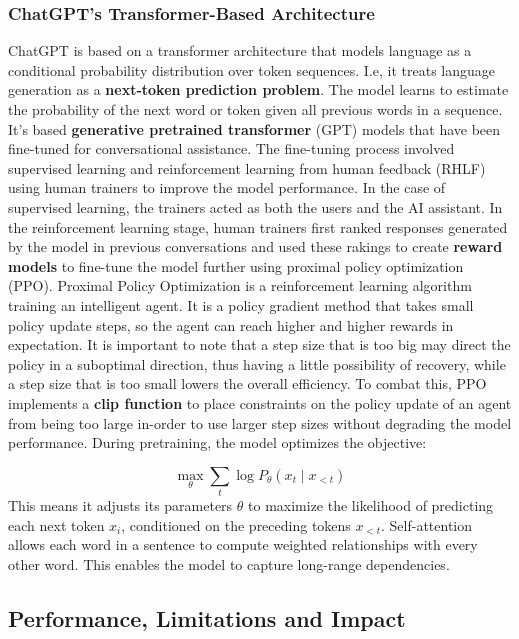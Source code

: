 \documentclass[11pt,a4paper]{report}
\begin{document}
\subsubsection{ChatGPT's Transformer-Based Architecture}
ChatGPT is based on a transformer architecture that models language as a conditional probability
distribution over token sequences. I.e, it treats language generation as a \textbf{next-token 
prediction problem}. The model learns to estimate the probability of the next word or token given
all previous words in a sequence. It's based \textbf{generative pretrained transformer} (GPT) models
that have been fine-tuned for conversational assistance. 
The fine-tuning process involved supervised learning and reinforcement learning from human feedback
(RHLF) using human trainers to improve the model performance. In the case of supervised learning, 
the trainers acted as both the users and the AI assistant. In the reinforcement learning stage, 
human trainers first ranked responses generated by the model in previous conversations and used
these rakings to create \textbf{reward models} to fine-tune the model further using proximal policy
optimization (PPO). Proximal Policy Optimization is a reinforcement learning algorithm training an
intelligent agent. It is a policy gradient method that takes small policy update steps, so the agent
can reach higher and higher rewards in expectation. It is important to note that a step size that is
too big may direct the policy in a suboptimal direction, thus having a little possibility of recovery,
while a step size that is too small lowers the overall efficiency. To combat this, PPO implements a 
\textbf{clip function} to place constraints on the policy update of an agent from being too large in-order
to use larger step sizes without degrading the model performance. During pretraining, the model optimizes
the objective:

\begin{equation*}
  \max_{\theta} \sum_{t} \log P_{\theta}(x_t \mid x_{<t})
\end{equation*}
This means it adjusts its parameters $\theta$ to maximize the likelihood of predicting each next token $x_i$,
conditioned on the preceding tokens $x_{<t}$. 
Self-attention allows each word in a sentence to compute weighted relationships with every other word. 
This enables the model to capture long-range dependencies.

\subsection{Performance, Limitations and Impact}
\end{document}
